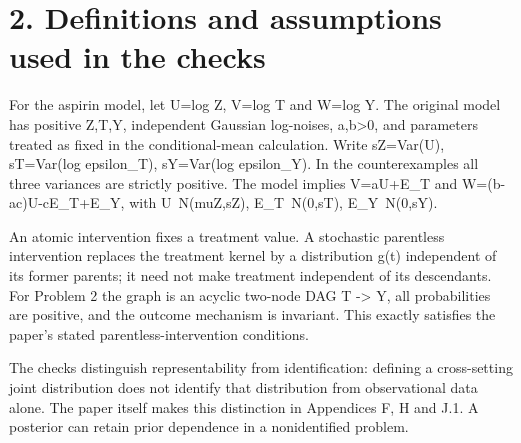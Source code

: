 \documentclass[10pt]{article}
\begin{document}
\section*{2. Definitions and assumptions used in the checks}
For the aspirin model, let U=log Z, V=log T and W=log Y. The original model has positive Z,T,Y, independent Gaussian log-noises, a,b>0, and parameters treated as fixed in the conditional-mean calculation. Write sZ=Var(U), sT=Var(log epsilon\_T), sY=Var(log epsilon\_Y). In the counterexamples all three variances are strictly positive. The model implies V=aU+E\_T and W=(b-ac)U-cE\_T+E\_Y, with U N(muZ,sZ), E\_T N(0,sT), E\_Y N(0,sY).\par
An atomic intervention fixes a treatment value. A stochastic parentless intervention replaces the treatment kernel by a distribution g(t) independent of its former parents; it need not make treatment independent of its descendants. For Problem 2 the graph is an acyclic two-node DAG T -> Y, all probabilities are positive, and the outcome mechanism is invariant. This exactly satisfies the paper’s stated parentless-intervention conditions.\par
The checks distinguish representability from identification: defining a cross-setting joint distribution does not identify that distribution from observational data alone. The paper itself makes this distinction in Appendices F, H and J.1. A posterior can retain prior dependence in a nonidentified problem.\par
\end{document}
